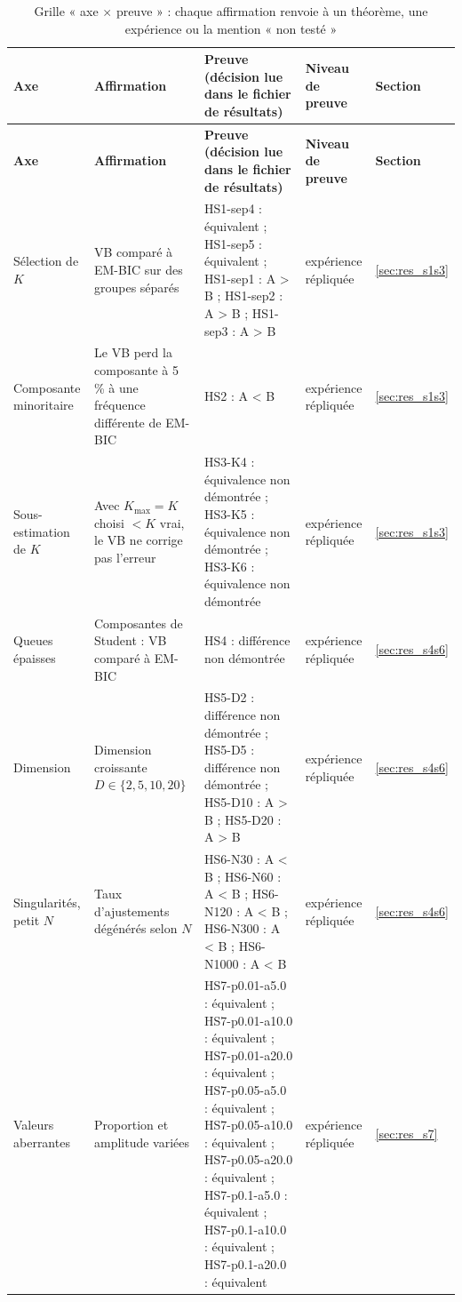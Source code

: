 {\scriptsize
\setlength{\tabcolsep}{3pt}
\begin{longtable}{>{\raggedright\arraybackslash}p{2.40cm}>{\raggedright\arraybackslash}p{4.20cm}>{\raggedright\arraybackslash}p{4.60cm}>{\raggedright\arraybackslash}p{2.20cm}>{\raggedright\arraybackslash}p{1.90cm}}
\caption{Grille « axe $\times$ preuve » : chaque affirmation renvoie à un théorème, une expérience ou la mention « non testé »}\label{tab:2_17}\\
\toprule
\textbf{Axe} & \textbf{Affirmation} & \textbf{Preuve (décision lue dans le fichier de résultats)} & \textbf{Niveau de preuve} & \textbf{Section} \\
\midrule
\endfirsthead
\toprule
\textbf{Axe} & \textbf{Affirmation} & \textbf{Preuve (décision lue dans le fichier de résultats)} & \textbf{Niveau de preuve} & \textbf{Section} \\
\midrule
\endhead
\bottomrule
\endfoot
Sélection de $K$ & VB comparé à EM-BIC sur des groupes séparés & HS1-sep4 : équivalent ; HS1-sep5 : équivalent ; HS1-sep1 : A > B ; HS1-sep2 : A > B ; HS1-sep3 : A > B & expérience répliquée & \ref{sec:res_s1s3} \\
Composante minoritaire & Le VB perd la composante à 5 \% à une fréquence différente de EM-BIC & HS2 : A < B & expérience répliquée & \ref{sec:res_s1s3} \\
Sous-estimation de $K$ & Avec $K_{\max}=K$ choisi $<K$ vrai, le VB ne corrige pas l'erreur & HS3-K4 : équivalence non démontrée ; HS3-K5 : équivalence non démontrée ; HS3-K6 : équivalence non démontrée & expérience répliquée & \ref{sec:res_s1s3} \\
Queues épaisses & Composantes de Student : VB comparé à EM-BIC & HS4 : différence non démontrée & expérience répliquée & \ref{sec:res_s4s6} \\
Dimension & Dimension croissante $D\in\{2,5,10,20\}$ & HS5-D2 : différence non démontrée ; HS5-D5 : différence non démontrée ; HS5-D10 : A > B ; HS5-D20 : A > B & expérience répliquée & \ref{sec:res_s4s6} \\
Singularités, petit $N$ & Taux d'ajustements dégénérés selon $N$ & HS6-N30 : A < B ; HS6-N60 : A < B ; HS6-N120 : A < B ; HS6-N300 : A < B ; HS6-N1000 : A < B & expérience répliquée & \ref{sec:res_s4s6} \\
Valeurs aberrantes & Proportion et amplitude variées & HS7-p0.01-a5.0 : équivalent ; HS7-p0.01-a10.0 : équivalent ; HS7-p0.01-a20.0 : équivalent ; HS7-p0.05-a5.0 : équivalent ; HS7-p0.05-a10.0 : équivalent ; HS7-p0.05-a20.0 : équivalent ; HS7-p0.1-a5.0 : équivalent ; HS7-p0.1-a10.0 : équivalent ; HS7-p0.1-a20.0 : équivalent & expérience répliquée & \ref{sec:res_s7} \\

\end{longtable}}
